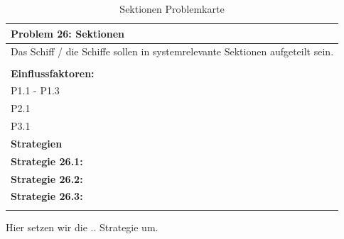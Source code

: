 \documentclass[fontsize=12pt,paper=a4,twoside]{scrartcl}
\begin{document}
\begin{table}[H]
    \centering
    \begin{tabular}{|p{15cm}|}
    \hline
          \textbf{Problem 26: Sektionen}  \\ \hline
	Das Schiff / die Schiffe sollen in systemrelevante Sektionen aufgeteilt sein. \\
         \\ \hline
          \textbf{Einflussfaktoren: } \\
	P1.1 - P1.3 \\
	P2.1 \\
	P3.1 \\
          \hline
          \textbf{Strategien} \\ \hline
            {}          
           \label{strategie:26.1}     
          \textbf{Strategie 26.1:}  \\        
  {}          
           \label{strategie:26.2}              
          \textbf{Strategie 26.2:}  \\
	 {}          
           \label{strategie:26.3}     
          \textbf{Strategie 26.3: }  \\ 
	 \\ \hline
    \end{tabular}

    \caption{Sektionen Problemkarte}
    \label{tab:ProblemKarte26}
\end{table}
Hier setzen wir die .. Strategie um. \\
\end{document}
